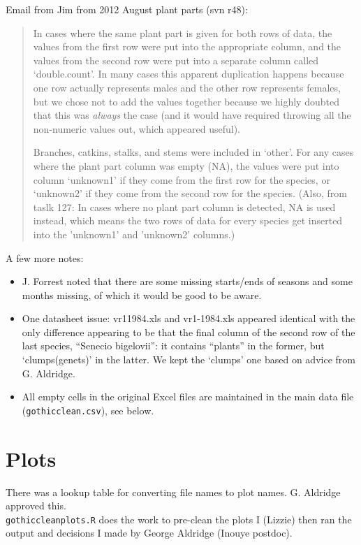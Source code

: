 \documentclass[11pt,a4paper]{article}
\begin{document}
Email from Jim from 2012 August plant parts (svn r48): 
\begin{quote}
In cases where the same plant part is given for both rows of data, the values from the first row were put into the appropriate column, and the
values from the second row were put into a separate column called `double.count'. In many cases this apparent duplication happens because
one row actually represents males and the other row represents females, but we chose not to add the values together because we highly doubted that this was \emph{always} the case (and it would have required throwing all the non-numeric values out, which appeared useful).

Branches, catkins, stalks, and stems were included in `other'. For any cases where the plant part column was empty (NA), the values were put into column `unknown1' if they come from the first
row for the species, or `unknown2' if they come from the second row
for the species. (Also, from taslk 127: In cases where no plant part
column is detected, NA is used instead, which means the two rows of
data for every species get inserted into the 'unknown1' and 'unknown2'
columns.)
\end{quote}

A few more notes:
\begin{itemize}
\item J. Forrest noted that there are some missing starts/ends of seasons and some months missing, of which it would be good to be aware.
\item One datasheet issue: vr11984.xls and vr1-1984.xls appeared
  identical with the only difference appearing to be that the final
  column of the second row of the last species, ``Senecio bigelovii'':
  it contains ``plants'' in the former, but `clumps(genets)' in the
  latter. We kept the `clumps' one based on advice from G. Aldridge.
\item All empty cells in the original Excel files are maintained in
  the main data file (\verb|gothicclean.csv|), see below.
\end{itemize}

\section{Plots}

There was a lookup table for converting file names to plot names. G. Aldridge approved this. \\

\verb|gothiccleanplots.R| does the work to pre-clean the plots
I (Lizzie) then ran the output and decisions I made by George Aldridge (Inouye postdoc).\\
\end{document}
